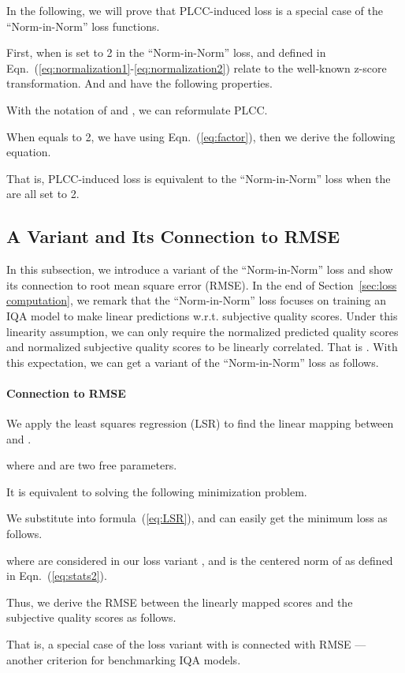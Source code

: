 \documentclass[sigconf]{acmart}
\begin{document}
In the following, we will prove that PLCC-induced loss  is a special case of the ``Norm-in-Norm'' loss functions.

First, when  is set to 2 in the ``Norm-in-Norm'' loss,  and  defined in Eqn.~(\ref{eq:normalization1}-\ref{eq:normalization2}) relate to the well-known z-score transformation. 
And  and  have the following properties.


With the notation of  and , we can reformulate PLCC.


When  equals to 2, we have  using Eqn.~(\ref{eq:factor}), then we derive the following equation.


That is, PLCC-induced loss is equivalent to the ``Norm-in-Norm'' loss  when the  are all set to 2.

\subsection{A Variant and Its Connection to RMSE}
In this subsection, we introduce a variant of the ``Norm-in-Norm'' loss and show its connection to root mean square error (RMSE).
In the end of Section~\ref{sec:loss computation}, we remark that the ``Norm-in-Norm'' loss focuses on training an IQA model to make linear predictions w.r.t. subjective quality scores.
Under this linearity assumption, we can only require the normalized predicted quality scores  and normalized subjective quality scores  to be linearly correlated. 
That is . 
With this expectation, we can get a variant of the ``Norm-in-Norm'' loss as follows.


\paragraph{Connection to RMSE} 
We apply the least squares regression (LSR) to find the linear mapping between  and .

where  and  are two free parameters. 

It is equivalent to solving the following minimization problem.


We substitute  into formula~(\ref{eq:LSR}), and can easily get the minimum loss as follows.

where  are considered in our loss variant , and  is the centered norm of  as defined in Eqn.~(\ref{eq:stats2}). 

Thus, we derive the RMSE between the linearly mapped scores and the subjective quality scores as follows.

That is, a special case of the loss variant  with  is connected with RMSE --- another criterion for benchmarking IQA models.
\end{document}
